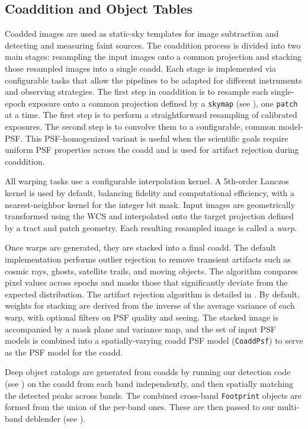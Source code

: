 \subsection{Coaddition and Object Tables}
\label{sec:coaddition-and-objects}

Coadded images are used as static-sky templates for image subtraction and detecting and measuring faint sources.
The coaddition process is divided into two main stages: resampling the input images onto a common projection and stacking those resampled images into a single coadd.
Each stage is implemented via configurable tasks that allow the pipelines to be adapted for different instruments and observing strategies.
The first step in coaddition is to resample each single-epoch exposure onto a common projection defined by a \texttt{skymap} (see ), one \texttt{patch} at a time.
The first step is to perform a straightforward resampling of calibrated exposures.
The second step is to convolve them to a configurable, common model-PSF.
This PSF-homogenized variant is useful when the scientific goals require uniform PSF properties across the coadd and is used for artifact rejection during coaddition.

All warping tasks use a configurable interpolation kernel.
A 5th-order Lanczos kernel is used by default, balancing fidelity and computational efficiency, with a nearest-neighbor kernel for the integer bit mask.
Input images are geometrically transformed using the WCS and interpolated onto the target projection defined by a tract and patch geometry.
Each resulting resampled image is called a \emph{warp}.

Once warps are generated, they are stacked into a final coadd.
The default implementation performs outlier rejection to remove transient artifacts such as cosmic rays, ghosts, satellite trails, and moving objects.
The algorithm compares pixel values across epochs and masks those that significantly deviate from the expected distribution.
The artifact rejection algorithm is detailed in \citet{DMTN-080}.
By default, weights for stacking are derived from the inverse of the average variance of each warp, with optional filters on PSF quality and seeing.
The stacked image is accompanied by a mask plane and variance map, and the set of input PSF models is combined into a spatially-varying coadd PSF model (\texttt{CoaddPsf}) to serve as the PSF model for the coadd.

Deep object catalogs are generated from coadds by running our detection code (see ) on the coadd from each band independently, and then spatially matching the detected peaks across bands.
The combined cross-band \texttt{Footprint} objects are formed from the union of the per-band ones.
These are then passed to our multi-band deblender (see ).

